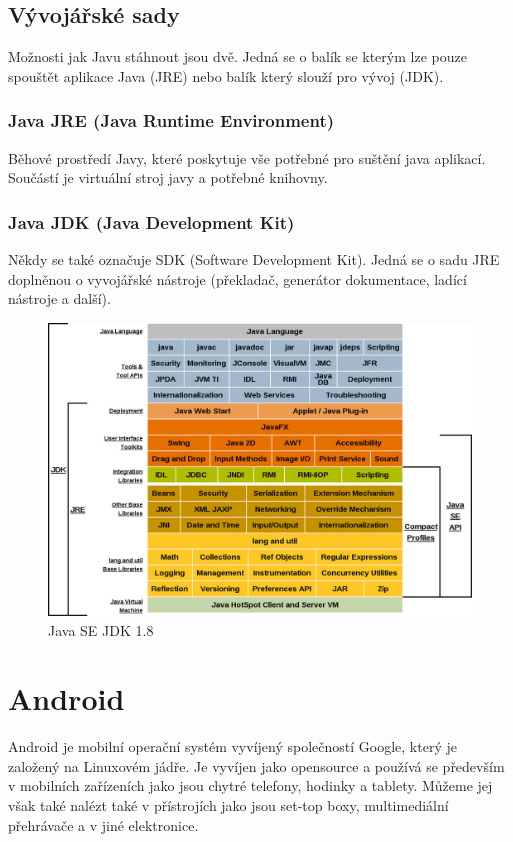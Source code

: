 \subsection{Vývojářské sady}
Možnosti jak Javu stáhnout jsou dvě. Jedná se o balík se kterým lze pouze spouštět aplikace Java (JRE) nebo balík který slouží pro vývoj (JDK).

\subsubsection{Java JRE (Java Runtime Environment)}
Běhové prostředí Javy, které poskytuje vše potřebné pro suštění java aplikací. Součástí je virtuální stroj javy a potřebné knihovny.

\subsubsection{Java JDK (Java Development Kit)}
Někdy se také označuje SDK (Software Development Kit). Jedná se o sadu JRE doplněnou o vyvojářské nástroje (překladač, generátor dokumentace, ladící nástroje a další).

\begin{figure}[h!]
    \centering
    \includegraphics[scale=0.3]{fig/java_jdk.jpg}
    \caption{Java SE JDK 1.8}
\end{figure}



\section{Android}
Android je mobilní operační systém vyvíjený společností Google, který je založený na Linuxovém jádře. Je vyvíjen jako opensource a používá se především v mobilních zařízeních jako jsou chytré telefony, hodinky a tablety. Můžeme jej však také nalézt také v přístrojích jako jsou set-top boxy, multimediální přehrávače a v jiné elektronice.\\

